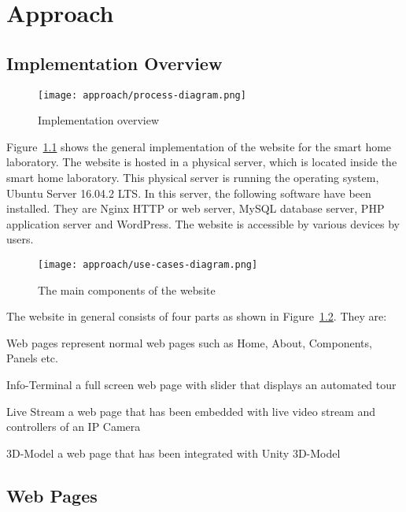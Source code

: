 \chapter{Approach}

\section{Implementation Overview}

\begin{figure}[ht]
\caption{Implementation overview}
\label{fig:implementation-overview}
\centering
\texttt{[image: approach/process-diagram.png]}
\end{figure}

Figure~\ref{fig:implementation-overview} shows the general implementation of the website for the smart home laboratory. The website is hosted in a physical server, which is located inside the smart home laboratory. This physical server is running the operating system, Ubuntu Server 16.04.2 LTS. In this server, the following software have been installed. They are Nginx HTTP or web server, MySQL database server, PHP application server and WordPress. The website is accessible by various devices by users.

\begin{figure}
\caption{The main components of the website}
\label{fig:use-cases-diagram}
\centering
\texttt{[image: approach/use-cases-diagram.png]}
\end{figure}

The website in general consists of four parts as shown in Figure~\ref{fig:use-cases-diagram}. They are:
\begin{description*}
\item[Web pages] represent normal web pages such as Home, About, Components, Panels etc.
\item[Info-Terminal] a full screen web page with slider that displays an automated tour
\item[Live Stream] a web page that has been embedded with live video stream and controllers of an IP Camera
\item[3D-Model] a web page that has been integrated with Unity 3D-Model
\end{description*}

\section{Web Pages}
